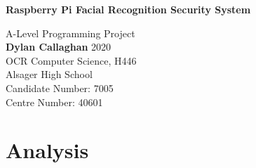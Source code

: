 \documentclass[9pt]{article}
\begin{document}
	
	\begin{titlepage}
		\begin{center}
			\vspace*{1cm}
			
			\Huge
			\textbf{Raspberry Pi Facial Recognition Security System}
			
			\vspace{0.5cm}
			\normalsize
			A-Level Programming Project
			\vspace{1.5cm} \\
			\textbf{Dylan Callaghan}
			\vfill
			\vspace{0.8cm}
			\normalsize
			2020\\
			OCR Computer Science, H446\\
			Alsager High School\\
			Candidate Number: 7005\\
			Centre Number: 40601
		\end{center}
	\end{titlepage}
\tableofcontents






\newpage
\pagestyle{fancy}
\section{Analysis}\label{sec_analysis}
\end{document}
